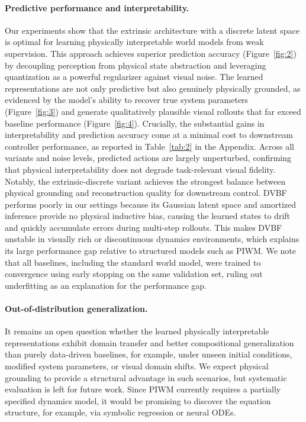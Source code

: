 \documentclass[nonacm,sigconf]{acmart}
\begin{document}
\paragraph{Predictive performance and interpretability.}
Our experiments show that the extrinsic architecture with a discrete latent space is optimal for learning physically interpretable world models from weak supervision. This approach achieves superior prediction accuracy (Figure~\ref{fig:2}) by decoupling perception from physical state abstraction and leveraging quantization as a powerful regularizer against visual noise. The learned representations are not only predictive but also genuinely physically grounded, as evidenced by the model's ability to recover true system parameters (Figure~\ref{fig:3}) and generate qualitatively plausible visual rollouts that far exceed baseline performance (Figure~\ref{fig:4}). Crucially, the substantial gains in interpretability and prediction accuracy come at a minimal cost to downstream controller performance, as reported in Table~\ref{tab:2} in the Appendix. Across all variants and noise levels, predicted actions are largely unperturbed, confirming that physical interpretability does not degrade task-relevant visual fidelity. Notably, the extrinsic-discrete variant achieves the strongest balance between physical grounding and reconstruction quality for downstream control. DVBF performs poorly in our settings because its Gaussian latent space and amortized inference provide no physical inductive bias, causing the learned states to drift and quickly accumulate errors during multi-step rollouts. This makes DVBF unstable in visually rich or discontinuous dynamics environments, which explains its large performance gap relative to structured models such as PIWM. We note that all baselines, including the standard world model, were trained to convergence using early stopping on the same validation set, ruling out underfitting as an explanation for the performance gap.

\paragraph{Out-of-distribution generalization.}
It remains an open question whether the learned physically interpretable representations exhibit domain transfer and better compositional generalization than purely data-driven baselines, for example, under unseen initial conditions, modified system parameters, or visual domain shifts. We expect physical grounding to provide a structural advantage in such scenarios, but systematic evaluation is left for future work. Since PIWM currently requires a partially specified dynamics model, it would be promising to discover the equation structure, for example, via symbolic regression or neural ODEs.
\end{document}
